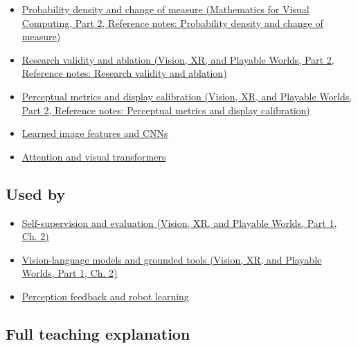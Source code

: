 \hypertarget{appendix-772f1fd96148-prerequisites}{}

\begin{itemize}
\tightlist
\item
  \href{../02-Mathematics-for-Visual-Computing-P02/main.pdf\#appendix-4815cd87ab8b}{Probability density and change of measure (Mathematics for Visual Computing, Part 2, Reference notes: Probability density and change of measure)}
\item
  \href{../07-Vision-XR-and-Playable-Worlds-P02/main.pdf\#appendix-65788587ef78}{Research validity and ablation (Vision, XR, and Playable Worlds, Part 2, Reference notes: Research validity and ablation)}
\item
  \href{../07-Vision-XR-and-Playable-Worlds-P02/main.pdf\#appendix-b2c1846508bf}{Perceptual metrics and display calibration (Vision, XR, and Playable Worlds, Part 2, Reference notes: Perceptual metrics and display calibration)}
\item
  \hyperref[appendix-47c51ea026fb]{Learned image features and CNNs}
\item
  \hyperref[appendix-a9d5dfdd164a]{Attention and visual transformers}
\end{itemize}

\subsection{Used by}\label{appendix-772f1fd96148-used-by}

\hypertarget{appendix-772f1fd96148-used-by}{}

\begin{itemize}
\tightlist
\item
  \href{../07-Vision-XR-and-Playable-Worlds-P01/main.pdf\#04-visual-computing-ii-ch031-self-supervision-and-evaluation}{Self-supervision and evaluation (Vision, XR, and Playable Worlds, Part 1, Ch. 2)}
\item
  \href{../07-Vision-XR-and-Playable-Worlds-P01/main.pdf\#04-visual-computing-ii-ch031-vision-language-models-and-grounded-tools}{Vision-language models and grounded tools (Vision, XR, and Playable Worlds, Part 1, Ch. 2)}
\item
  \hyperref[appendix-b0c42da325f1]{Perception feedback and robot learning}
\end{itemize}

\subsection{Full teaching explanation}\label{appendix-772f1fd96148-full-teaching-explanation}

